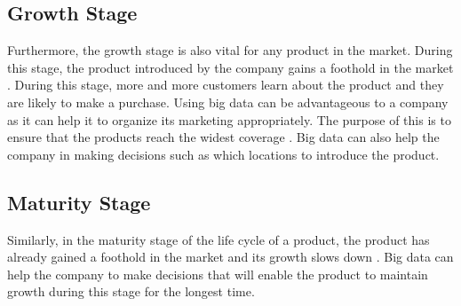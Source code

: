 \documentclass[sigconf]{acmart}
\begin{document}
\subsection{Growth Stage}
Furthermore, the growth stage is also vital for any product in the market. During this stage, the product introduced by the company gains a foothold in the market \cite{Stark2015}. During this stage, more and more customers learn about the product and they are likely to make a purchase. Using big data can be advantageous to a company as it can help it to organize its marketing appropriately. The purpose of this is to ensure that the products reach the widest coverage \cite{Ron2016}. Big data can also help the company in making decisions such as which locations to introduce the product.
\subsection{Maturity Stage}
Similarly, in the maturity stage of the life cycle of a product, the product has already gained a foothold in the market and its growth slows down \cite{Stark2015}. Big data can help the company to make decisions that will enable the product to maintain growth during this stage for the longest time.
\end{document}

